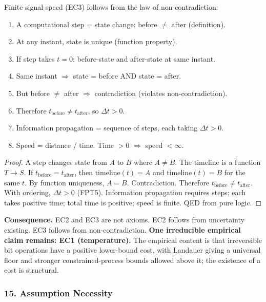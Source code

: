 \begin{theorem}\label{thm:ec3-derived}
Finite signal speed (EC3) follows from the law of non-contradiction:
\begin{enumerate}
\item A computational step = state change: before $\neq$ after (definition).
\item At any instant, state is unique (function property).
\item If step takes $t = 0$: before-state and after-state at same instant.
\item Same instant $\Rightarrow$ state = before AND state = after.
\item But before $\neq$ after $\Rightarrow$ contradiction (violates non-contradiction).
\item Therefore $t_{\text{before}} \neq t_{\text{after}}$, so $\Delta t > 0$.
\item Information propagation = sequence of steps, each taking $\Delta t > 0$.
\item Speed = distance / time. Time $> 0$ $\Rightarrow$ speed $< \infty$.
\end{enumerate}
\end{theorem}

\begin{proof}
A step changes state from $A$ to $B$ where $A \neq B$. The timeline is a function $T \to S$. If $t_{\text{before}} = t_{\text{after}}$, then $\text{timeline}(t) = A$ and $\text{timeline}(t) = B$ for the same $t$. By function uniqueness, $A = B$. Contradiction. Therefore $t_{\text{before}} \neq t_{\text{after}}$. With ordering, $\Delta t > 0$ (FPT5). Information propagation requires steps; each takes positive time; total time is positive; speed is finite. QED from pure logic.
\end{proof}

\noindent\textbf{Consequence.} EC2 and EC3 are not axioms. EC2 follows from uncertainty existing. EC3 follows from non-contradiction. \textbf{One irreducible empirical claim remains: EC1 (temperature).} The empirical content is that irreversible bit operations have a positive lower-bound cost, with Landauer giving a universal floor and stronger constrained-process bounds allowed above it; the existence of a cost is structural.

\subsubsection{15. Assumption Necessity}

